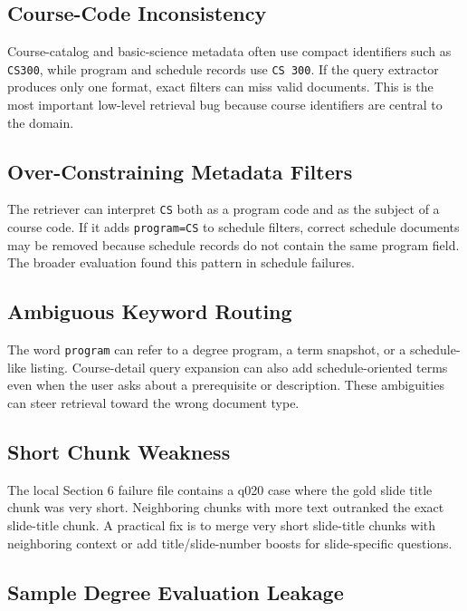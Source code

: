 \documentclass[10pt,a4paper]{article}
\newcommand{\code}[1]{\texttt{\small #1}}
\begin{document}
\subsection{Course-Code Inconsistency}

Course-catalog and basic-science metadata often use compact identifiers such as \code{CS300}, while program and schedule records use \code{CS 300}. If the query extractor produces only one format, exact filters can miss valid documents. This is the most important low-level retrieval bug because course identifiers are central to the domain.

\subsection{Over-Constraining Metadata Filters}

The retriever can interpret \code{CS} both as a program code and as the subject of a course code. If it adds \code{program=CS} to schedule filters, correct schedule documents may be removed because schedule records do not contain the same program field. The broader evaluation found this pattern in schedule failures.

\subsection{Ambiguous Keyword Routing}

The word \code{program} can refer to a degree program, a term snapshot, or a schedule-like listing. Course-detail query expansion can also add schedule-oriented terms even when the user asks about a prerequisite or description. These ambiguities can steer retrieval toward the wrong document type.

\subsection{Short Chunk Weakness}

The local Section 6 failure file contains a q020 case where the gold slide title chunk was very short. Neighboring chunks with more text outranked the exact slide-title chunk. A practical fix is to merge very short slide-title chunks with neighboring context or add title/slide-number boosts for slide-specific questions.

\subsection{Sample Degree Evaluation Leakage}
\end{document}
